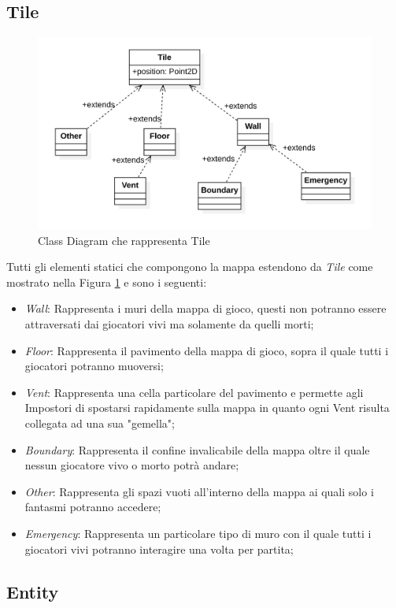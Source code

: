 \subsection{Tile}
\begin{figure}[ht]
\centering
\includegraphics[width=\textwidth, scale=0.44]{img/tile.png}
\caption{Class Diagram che rappresenta Tile}
\label{fig:ClasDiagRaprTile}
\end{figure}
Tutti gli elementi statici che compongono la mappa estendono da \textit{Tile} come mostrato nella Figura \ref{fig:ClasDiagRaprTile} e sono i seguenti:
\begin{itemize}
    \item \textit{Wall}: Rappresenta i muri della mappa di gioco, questi non potranno essere attraversati dai giocatori vivi ma solamente da quelli morti;
    \item \textit{Floor}: Rappresenta il pavimento della mappa di gioco, sopra il quale tutti i giocatori potranno muoversi;
    \item \textit{Vent}: Rappresenta una cella particolare del pavimento e permette agli Impostori di spostarsi rapidamente sulla mappa in quanto ogni Vent risulta collegata ad una sua "gemella";
    \item \textit{Boundary}: Rappresenta il confine invalicabile della mappa oltre il quale nessun giocatore vivo o morto potr\`a andare;
    \item \textit{Other}: Rappresenta gli spazi vuoti all'interno della mappa ai quali solo i fantasmi potranno accedere; 
    \item \textit{Emergency}: Rappresenta un particolare tipo di muro con il quale tutti i giocatori vivi potranno interagire una volta per partita;
\end{itemize}

\subsection{Entity}

